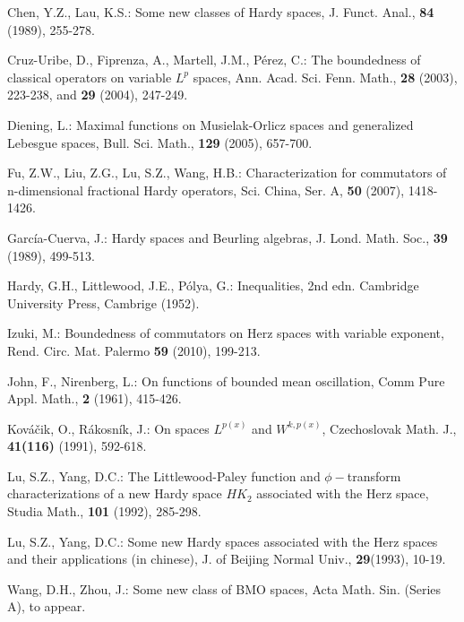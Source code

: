 \documentclass{amse-new}
\numberwithin{equation}{section} %
\begin{document}
\begin{thebibliography}{99}

Chen, Y.Z., Lau, K.S.: Some new classes of Hardy spaces, J. Funct. Anal., {\bf84} (1989), 255-278.

Cruz-Uribe, D., Fiprenza, A., Martell, J.M., P\'{e}rez, C.: The boundedness of classical operators on variable $L^{p}$ spaces, Ann. Acad. Sci. Fenn. Math., {\bf 28} (2003), 223-238, and {\bf 29} (2004), 247-249.

Diening, L.: Maximal functions on Musielak-Orlicz spaces and generalized Lebesgue spaces, Bull. Sci. Math., {\bf 129} (2005), 657-700.

Fu, Z.W., Liu, Z.G., Lu, S.Z., Wang, H.B.: Characterization for commutators of n-dimensional fractional Hardy operators,
Sci. China, Ser. A, {\bf50} (2007), 1418-1426.

Garc\'{i}a-Cuerva, J.: Hardy spaces and Beurling algebras, J. Lond. Math. Soc., {\bf39} (1989), 499-513.

Hardy, G.H., Littlewood, J.E., P\'{o}lya, G.: Inequalities, 2nd edn. Cambridge University Press, Cambrige (1952).

Izuki, M.: Boundedness of commutators on Herz spaces with variable exponent, Rend.
Circ. Mat. Palermo {\bf59} (2010), 199-213.

John, F., Nirenberg, L.: On functions of bounded mean oscillation, Comm Pure Appl. Math., {\bf 2} (1961), 415-426.

Kov\'{a}\v{c}ik, O., R\'{a}kosn\'{i}k, J.: On spaces $L^{p(x)}$ and $W^{k,p(x)}$, Czechoslovak Math. J., {\bf 41(116)} (1991), 592-618.

Lu, S.Z., Yang, D.C.: The Littlewood-Paley function and $\phi-$transform characterizations of a new Hardy space $HK_{2}$ associated with the Herz space, Studia Math., {\bf 101} (1992), 285-298.

Lu, S.Z., Yang, D.C.: Some new Hardy spaces associated with the Herz spaces and their applications (in chinese), J. of Beijing Normal Univ., {\bf29}(1993), 10-19.

Wang, D.H., Zhou, J.: Some new class of {\rm BMO} spaces, Acta Math. Sin. (Series A), to appear.

\end{thebibliography}
\end{document}

